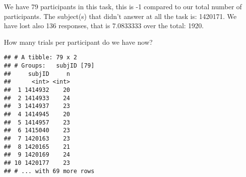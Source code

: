 \documentclass[
]{article}
\newenvironment{Shaded}{\begin{snugshade}}{\end{snugshade}}
\newcommand{\KeywordTok}[1]{\textcolor[rgb]{0.13,0.29,0.53}{\textbf{#1}}}
\newcommand{\NormalTok}[1]{#1}
\newcommand{\OperatorTok}[1]{\textcolor[rgb]{0.81,0.36,0.00}{\textbf{#1}}}
\newcommand{\StringTok}[1]{\textcolor[rgb]{0.31,0.60,0.02}{#1}}
\begin{document}
\begin{Shaded}
\end{Shaded}

\begin{Shaded}
\end{Shaded}

We have 79 participants in this task, this is -1 compared to our total
number of participants. The subject(s) that didn't answer at all the
task is: 1420171. We have lost also 136 responses, that is 7.0833333
over the total: 1920.

How many trials per participant do we have now?

\begin{Shaded}
\end{Shaded}

\begin{verbatim}
## # A tibble: 79 x 2
## # Groups:   subjID [79]
##     subjID     n
##      <int> <int>
##  1 1414932    20
##  2 1414933    24
##  3 1414937    23
##  4 1414945    20
##  5 1414957    23
##  6 1415040    23
##  7 1420163    23
##  8 1420165    21
##  9 1420169    24
## 10 1420177    23
## # ... with 69 more rows
\end{verbatim}
\end{document}
